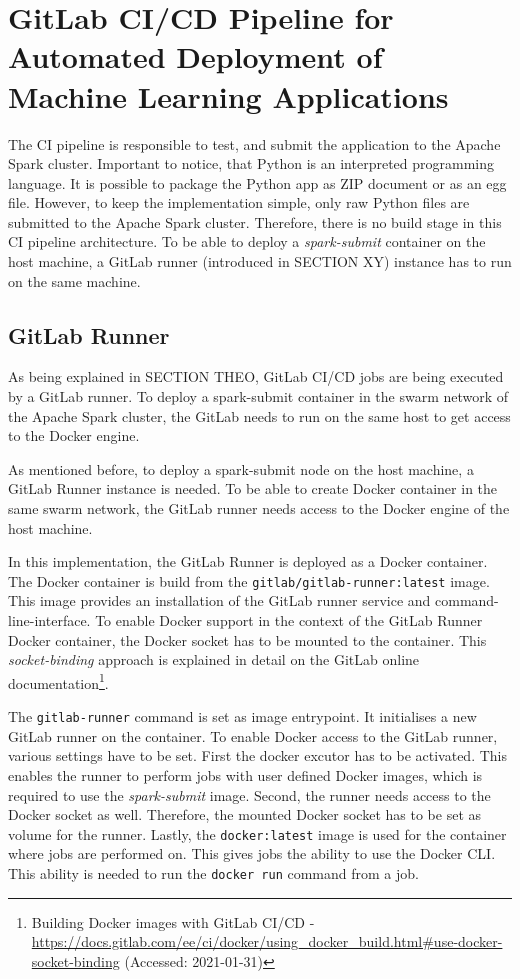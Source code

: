 \section{GitLab CI/CD Pipeline for Automated Deployment of Machine Learning Applications}
%
The CI pipeline is responsible to test, and submit the application to the Apache Spark cluster.
%
Important to notice, that Python is an interpreted programming language. It is possible to package the Python app as ZIP document or as an egg file. However, to keep the implementation simple, only raw Python files are submitted to the Apache Spark cluster. Therefore, there is no build stage in this CI pipeline architecture.
%
To be able to deploy a \textit{spark-submit} container on the host machine, a GitLab runner (introduced in SECTION XY) instance has to run on the same machine.


\subsection{GitLab Runner}

As being explained in SECTION THEO, GitLab CI/CD jobs are being executed by a GitLab runner.
To deploy a spark-submit container in the swarm network of the Apache Spark cluster, the GitLab needs to run on the same host to get access to the Docker engine.


%
As mentioned before, to deploy a spark-submit node on the host machine, a GitLab Runner instance is needed.
To be able to create Docker container in the same swarm network, the GitLab runner needs access to the Docker engine of the host machine.


In this implementation, the GitLab Runner is deployed as a Docker container.
The Docker container is build from the \texttt{gitlab/gitlab-runner:latest} image. This image provides an installation of the GitLab runner service and command-line-interface.
To enable Docker support in the context of the GitLab Runner Docker container, the Docker socket has to be mounted to the container. This \textit{socket-binding} approach is explained in detail on the GitLab online documentation\footnote{Building Docker images with GitLab CI/CD  - \url{https://docs.gitlab.com/ee/ci/docker/using_docker_build.html\#use-docker-socket-binding} (Accessed: 2021-01-31)}.


The \texttt{gitlab-runner} command is set as image entrypoint. It initialises a new GitLab runner on the container.
To enable Docker access to the GitLab runner, various settings have to be set. First the docker excutor has to be activated. This enables the runner to perform jobs with user defined Docker images, which is required to use the \textit{spark-submit} image. Second, the runner needs access to the Docker socket as well. Therefore, the mounted Docker socket has to be set as volume for the runner. Lastly, the \texttt{docker:latest} image is used for the container where jobs are performed on. This gives jobs the ability to use the Docker CLI. This ability is needed to run the \texttt{docker run} command from a job.


